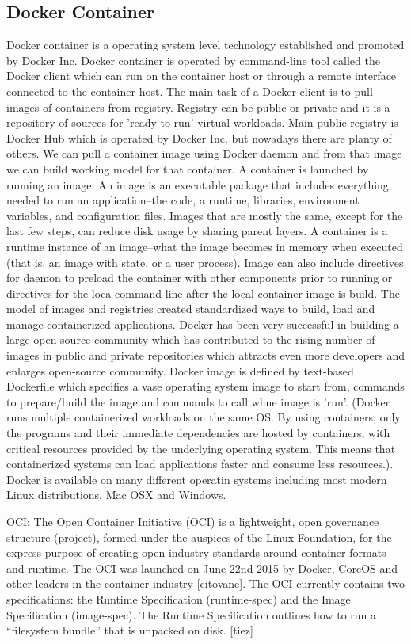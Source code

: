 \begin{itemize}
\section{Docker Container}
Docker container is a operating system level technology established  and promoted by Docker Inc. Docker container is operated by command-line tool called the Docker client which can run on the container host or through a remote interface connected to the container host. The main task of a Docker client is to pull images of containers from registry. Registry can be public or private and it is a repository of sources for 'ready to run' virtual workloads. Main public registry is Docker Hub which is operated by Docker Inc. but nowadays there are planty of others. We can pull a container image using Docker daemon and from that image we can build working model for that container. A container is launched by running an image. An image is an executable package that includes everything needed to run an application–the code, a runtime, libraries, environment variables, and configuration files. Images that are mostly the same, except for the last few steps, can reduce disk usage by sharing parent layers. A container is a runtime instance of an image–what the image becomes in memory when executed (that is, an image with state, or a user process). Image can also include directives for daemon to preload the container with other components prior to running or directives for the loca command line after the local container image is build. The model of images and registries created standardized ways to build, load and manage containerized applications. Docker has been very successful in building a large open-source community which has contributed to the rising number of images in public and private repositories which attracts even more developers and enlarges open-source community. Docker image is defined by text-based Dockerfile which specifies a vase operating system image to start from, commands to prepare/build the image and commands to call whne image is 'run'. (Docker runs multiple containerized workloads on the same OS. By using containers, only the programs and their immediate dependencies are hosted by containers, with critical resources provided by the underlying operating system.  This means that containerized systems can load applications faster and consume less resources.). Docker is available on many different operatin systems including most modern Linux distributions, Mac OSX and Windows.

OCI: The Open Container Initiative (OCI) is a lightweight, open governance structure (project), formed under the auspices of the Linux Foundation, for the express purpose of creating open industry standards around container formats and runtime. The OCI was launched on June 22nd 2015 by Docker, CoreOS and other leaders in the container industry [citovane]. The OCI currently contains two specifications: the Runtime Specification (runtime-spec) and the Image Specification (image-spec). The Runtime Specification outlines how to run a “filesystem bundle” that is unpacked on disk. [tiez]


\end{itemize}
